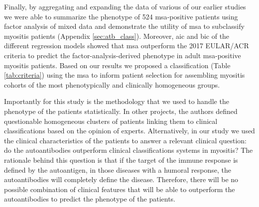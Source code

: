 Finally, by aggregating and expanding the data of various of our earlier studies we were able to summarize the phenotype of 524 \gls{msa}-positive patients using factor analysis of mixed data and demonstrate the utility of \gls{msa} to subclassify myositis patients (Appendix \autoref{sec:atb_class}). Moreover, \gls{aic} and \gls{bic} of the different regression models showed that \gls{msa} outperform the 2017 EULAR/ACR criteria to predict the factor-analysis-derived phenotype in adult \gls{msa}-positive myositis patients. Based on our results we proposed a classification (Table \ref{tab:criteria}) using the \gls{msa} to inform patient selection for assembling myositis cohorts of the most phenotypically and clinically homogeneous groups.

Importantly for this study is the methodology that we used to handle the phenotype of the patients statistically. In other projects, the authors defined questionable homogeneous clusters of patients linking them to clinical classifications based on the opinion of experts.\cite{Mariampillai2018} Alternatively, in our study we used the clinical characteristics of the patients to answer a relevant clinical question: do the autoantibodies outperform clinical classifications systems in myositis? The rationale behind this question is that if the target of the immune response is defined by the autoantigen, in those diseases with a humoral response, the autoantibodies will completely define the disease. Therefore, there will be no possible combination of clinical features that will be able to outperform the autoantibodies to predict the phenotype of the patients.

\begin{table}
\caption{Proposal of myositis classification based on myositis-specific autoantibodies}
\label{tab:criteria}
\end{table}

